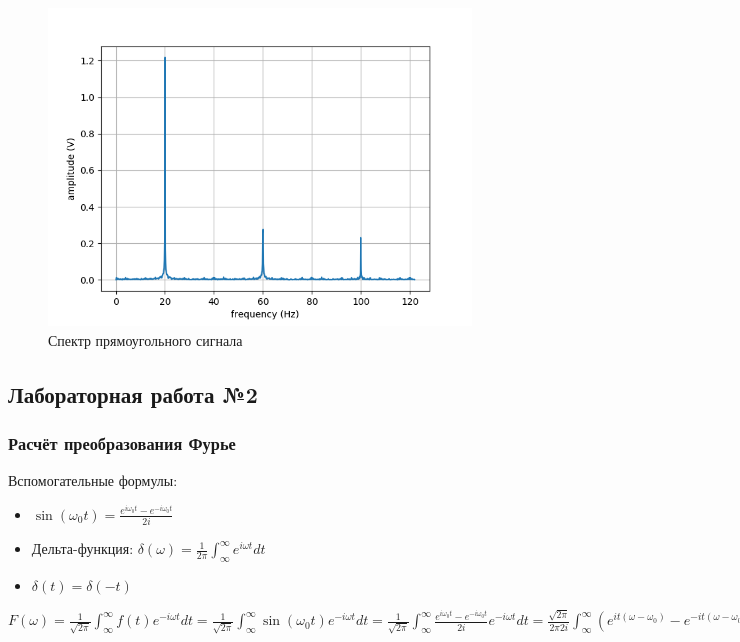 \begin{figure}[H]
	\begin{center}
		\includegraphics[scale=0.7]{../../lab1/out/square_freq.png}
		\caption{Спектр прямоугольного сигнала} 
		\label{pic:square_freq} %
	\end{center}
\end{figure}

\newpage
\subsection{Лабораторная работа №2}
\subsubsection{Расчёт преобразования Фурье}
Вспомогательные формулы:
\begin{itemize}
	\item $ \sin(\omega_0 t) = \frac{e^{i \omega_0 t} - e^{-i \omega_0 t}}{2 i} $
	\item Дельта-функция: $ \delta(\omega) = \frac{1}{2 \pi} \int_\infty^\infty e^{i \omega t} dt $
	\item $ \delta(t) = \delta(-t) $
\end{itemize}

$F(\omega) = \frac{1}{\sqrt{2 \pi}} \int_\infty^\infty f(t) e^{-i \omega t} dt = 
\frac{1}{\sqrt{2 \pi}} \int_\infty^\infty \sin(\omega_0 t) e^{-i \omega t} dt = 
\frac{1}{\sqrt{2 \pi}} \int_\infty^\infty \frac{e^{i \omega_0 t} - e^{-i \omega_0 t}}{2 i} e^{-i \omega t} dt = 
\frac{\sqrt{2 \pi}}{2 \pi 2 i} \int_\infty^\infty (e ^ {i t (\omega - \omega_0)} - e^{-it(\omega - \omega_0)}) dt = 
\frac{\sqrt{2 \pi}}{2 i} (\delta(\omega - \omega_0) - \delta(\omega + \omega_0) $

